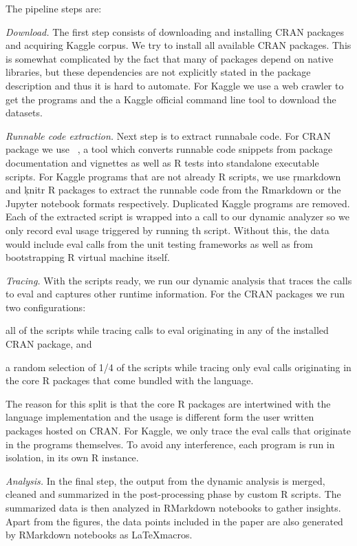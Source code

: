 \documentclass[screen,acmsmall]{acmart}
\begin{document}
\noindent The pipeline steps are:
\begin{compactenum}
  \item \emph{Download.} The first step consists of downloading and installing
    CRAN packages and acquiring Kaggle corpus. We try to install all available
    CRAN packages. This is somewhat complicated by the fact that many of
    packages depend on native libraries, but these dependencies are not
    explicitly stated in the package description and thus it is hard to
    automate. For Kaggle we use a web crawler to get the programs and the a
    Kaggle official command line tool to download the datasets.
  \item \emph{Runnable code extraction.} Next step is to extract runnabale code.
    For CRAN package we use \genthat~\cite{issta18}, a tool which converts
    runnable code snippets from package documentation and vignettes as well as R
    tests into standalone executable scripts. For Kaggle programs that are not
    already R scripts, we use \c{rmarkdown} and \c{knitr} R packages to extract
    the runnable code from the Rmarkdown or the Jupyter notebook formats
    respectively. Duplicated Kaggle programs are removed. Each of the extracted
    script is wrapped into a call to our dynamic analyzer so we only record eval
    usage triggered by running th script. Without this, the data would include
    eval calls from the unit testing frameworks as well as from bootstrapping R
    virtual machine itself.
  \item \emph{Tracing.} With the scripts ready, we run our dynamic analysis that
    traces the calls to eval and captures other runtime information. For the
    CRAN packages we run two configurations:
  \begin{inparaenum}[(1)]
    \item all of the \CranRunnableScriptsRnd scripts while tracing calls to eval
      originating in any of the \CranAllPackages installed CRAN package, and
    \item a random selection of 1/4 of the scripts while tracing only eval calls
      originating in the core R packages that come bundled with the language.
  \end{inparaenum}
    The reason for this split is that the core R packages are intertwined with
    the language implementation and the usage is different form the user written
    packages hosted on CRAN. For Kaggle, we only trace the eval calls that
    originate in the programs themselves. To avoid any interference, each
    program is run in isolation, in its own R instance.
  \item \emph{Analysis.} In the final step, the output from the dynamic analysis
    is merged, cleaned and summarized in the post-processing phase by custom R
    scripts. The summarized data is then analyzed in RMarkdown notebooks to
    gather insights. Apart from the figures, the data points included in the
    paper are also generated by RMarkdown notebooks as \LaTeX macros.
\end{compactenum}
\end{document}
